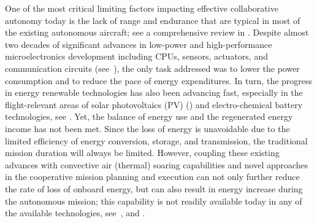 \documentclass{ifacconf}
\begin{document}
One of the most critical limiting factors impacting effective collaborative
autonomy today is the lack of range and endurance that are typical in most of
the existing autonomous aircraft; see a comprehensive review in
\cite{NAC:2005}.
%
%
Despite almost two decades of significant advances in low-power and
high-performance microelectronics development including CPUs, sensors,
actuators, and communication circuits (see~\cite{Singh:2010}), the only task
addressed was to lower the power consumption and to reduce the pace of energy
expenditures. In turn, the progress in energy renewable technologies has also
been advancing fast, especially in the flight-relevant areas of solar
photovoltaics (PV) (\cite{Hamakawa:2004}) and electro-chemical battery
technologies, see \cite{Tarascon:2001}. Yet, the balance of energy use and
the regenerated energy income has not been met. Since the loss of energy is
unavoidable due to the limited efficiency of energy conversion, storage, and
transmission, the traditional mission duration will always be limited.
However, coupling these existing advances with convective air (thermal)
soaring capabilities and novel approaches in the cooperative mission planning
and execution can not only further reduce the rate of loss of onboard energy,
but can also result in energy increase during the autonomous mission; this
capability is not readily available today in any of the available
technologies, see~\cite{Martinez:2008}, and
\cite{Nonami:2013}.
\end{document}

